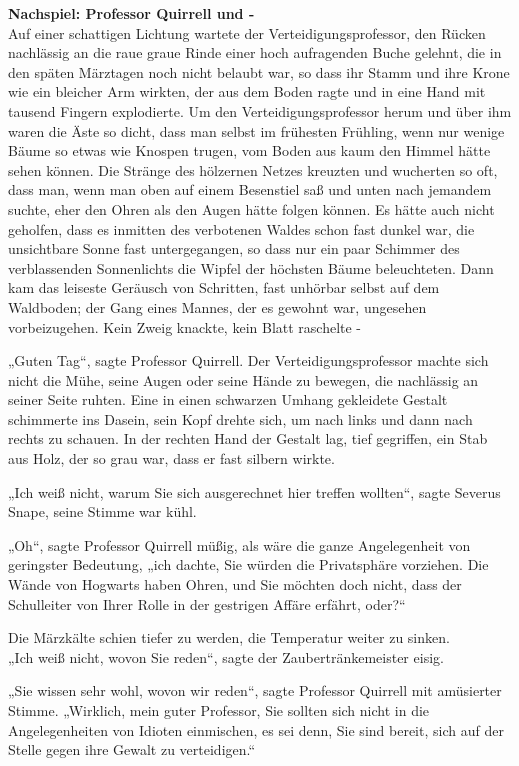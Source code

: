 {\textbf{Nachspiel: Professor Quirrell und -}\\ Auf einer schattigen Lichtung wartete der Verteidigungsprofessor, den Rücken nachlässig an die raue graue Rinde einer hoch aufragenden Buche gelehnt, die in den späten Märztagen noch nicht belaubt war, so dass ihr Stamm und ihre Krone wie ein bleicher Arm wirkten, der aus dem Boden ragte und in eine Hand mit tausend Fingern explodierte. Um den Verteidigungsprofessor herum und über ihm waren die Äste so dicht, dass man selbst im frühesten Frühling, wenn nur wenige Bäume so etwas wie Knospen trugen, vom Boden aus kaum den Himmel hätte sehen können. Die Stränge des hölzernen Netzes kreuzten und wucherten so oft, dass man, wenn man oben auf einem Besenstiel saß und unten nach jemandem suchte, eher den Ohren als den Augen hätte folgen können. Es hätte auch nicht geholfen, dass es inmitten des verbotenen Waldes schon fast dunkel war, die unsichtbare Sonne fast untergegangen, so dass nur ein paar Schimmer des verblassenden Sonnenlichts die Wipfel der höchsten Bäume beleuchteten. Dann kam das leiseste Geräusch von Schritten, fast unhörbar selbst auf dem Waldboden; der Gang eines Mannes, der es gewohnt war, ungesehen vorbeizugehen. Kein Zweig knackte, kein Blatt raschelte -

„Guten Tag“, sagte Professor Quirrell. Der Verteidigungsprofessor machte sich nicht die Mühe, seine Augen oder seine Hände zu bewegen, die nachlässig an seiner Seite ruhten. Eine in einen schwarzen Umhang gekleidete Gestalt schimmerte ins Dasein, sein Kopf drehte sich, um nach links und dann nach rechts zu schauen. In der rechten Hand der Gestalt lag, tief gegriffen, ein Stab aus Holz, der so grau war, dass er fast silbern wirkte.

„Ich weiß nicht, warum Sie sich ausgerechnet hier treffen wollten“, sagte Severus Snape, seine Stimme war kühl.

„Oh“, sagte Professor Quirrell müßig, als wäre die ganze Angelegenheit von geringster Bedeutung, „ich dachte, Sie würden die Privatsphäre vorziehen. Die Wände von Hogwarts haben Ohren, und Sie möchten doch nicht, dass der Schulleiter von Ihrer Rolle in der gestrigen Affäre erfährt, oder?“

Die Märzkälte schien tiefer zu werden, die Temperatur weiter zu sinken.\\ „Ich weiß nicht, wovon Sie reden“, sagte der Zaubertränkemeister eisig.

„Sie wissen sehr wohl, wovon wir reden“, sagte Professor Quirrell mit amüsierter Stimme. „Wirklich, mein guter Professor, Sie sollten sich nicht in die Angelegenheiten von Idioten einmischen, es sei denn, Sie sind bereit, sich auf der Stelle gegen ihre Gewalt zu verteidigen.“

}
